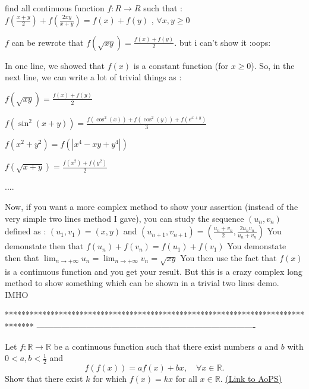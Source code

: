 \begin{solution}
	\begin{tcolorbox}\begin{tcolorbox}find all continuous function $ f: R\to R$ such that : $ f(\frac {x + y}{2}) + f( \frac {2xy}{x + y}) = f(x) + f(y)$ , $ \forall x,y \ge 0$\end{tcolorbox} 
 $ f$ can be rewrote that $ f(\sqrt {xy} ) = \frac {{f(x) + f(y)}}{2}$. but i can't show it  :oops:\end{tcolorbox}

In one line, we showed that $ f(x)$ is a constant function (for $ x\geq 0$). So, in the next line, we can write a lot of trivial things as : 

$ f(\sqrt {xy} ) = \frac {{f(x) + f(y)}}{2}$

$ f(\sin^2(x + y) ) = \frac {f(\cos^2(x)) + f(\cos^2(y)) + f(e^{x + y})}{3}$

$ f(x^2 + y^2) = f(|x^4 - xy + y^4|)$

$ f(\sqrt {x + y} ) = \frac {{f(x^2) + f(y^2)}}{2}$

....

Now, if you want a more complex method to show your assertion (instead of the very simple two lines method I gave), you can study the sequence $ (u_n,v_n)$ defined as : $ (u_1,v_1)=(x,y)$ and $ (u_{n+1},v_{n+1})=(\frac{u_n+v_n}2,\frac{2u_nv_n}{u_n+v_n})$
You demonstate then that $ f(u_n)+f(v_n)=f(u_1)+f(v_1)$
You demonstate then that $ \lim_{n\to +\infty}u_n=\lim_{n\to +\infty}v_n=\sqrt{xy}$
You then use the fact that $ f(x)$ is a continuous function and you get your result.
But this is a crazy complex long method to show something which can be shown in a trivial two lines demo.
IMHO
\end{solution}
*******************************************************************************
-------------------------------------------------------------------------------

\begin{problem}
	Let $f: \mathbb R \to \mathbb R$ be a continuous function such that there exist numbers $a$ and $b$ with $ 0<a,b<\frac{1}{2}$ and 
\[ f(f(x))=af(x)+bx, \quad \forall x \in \mathbb R.\]
Show that there exist $ k$ for which $ f(x)=kx$ for all $x \in \mathbb R$.
	\flushright \href{https://artofproblemsolving.com/community/c6h300002}{(Link to AoPS)}
\end{problem}



